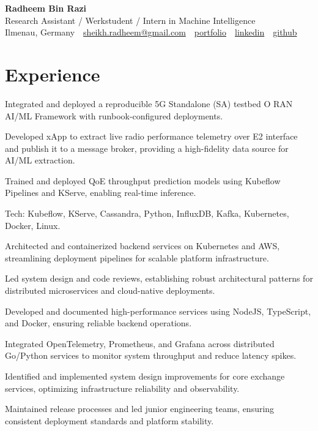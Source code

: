 \documentclass[10pt,a4paper]{resume}
\makeatletter
\newcommand{\Portfolio}{https://radheem.github.io/my-cv}
\newcommand{\PortfolioText}{portfolio}
\newcommand{\GitHub}{https://github.com/radheem}
\newcommand{\LinkedIn}{https://www.linkedin.com/in/radheem-razi}
\newcommand{\Email}{sheikh.radheem@gmail.com}
\makeatother
\begin{document}
\begin{center}
  {\huge\bfseries Radheem Bin Razi}\\[3pt]
  {\large Research Assistant / Werkstudent / Intern in Machine Intelligence}\\[6pt]
  \small
  Ilmenau, Germany \,\textbar\,
  \href{mailto:\Email}{\Email} \,\textbar\,
  \href{\Portfolio}{\PortfolioText} \,\textbar\,
  \href{\LinkedIn}{linkedin} \,\textbar\,
  \href{\GitHub}{github}
\end{center}
\vspace{2pt}

\section{Experience}

\bullets
  \item Integrated and deployed a reproducible 5G Standalone (SA) testbed O RAN AI/ML Framework with runbook-configured deployments.
  \item Developed xApp to extract live radio performance telemetry over E2 interface and publish it to a message broker, providing a high-fidelity data source for AI/ML extraction.
  \item Trained and deployed QoE throughput prediction models using Kubeflow Pipelines and KServe, enabling real-time inference.
  \item Tech: Kubeflow, KServe, Cassandra, Python, InfluxDB, Kafka, Kubernetes, Docker, Linux.
\bulletsend
\vspace{1.5pt}
\bullets
  \item Architected and containerized backend services on Kubernetes and AWS, streamlining deployment pipelines for scalable platform infrastructure.
  \item Led system design and code reviews, establishing robust architectural patterns for distributed microservices and cloud-native deployments.
  \item Developed and documented high-performance services using NodeJS, TypeScript, and Docker, ensuring reliable backend operations.
\bulletsend
\vspace{1.5pt}
\bullets
  \item Integrated OpenTelemetry, Prometheus, and Grafana across distributed Go/Python services to monitor system throughput and reduce latency spikes.
  \item Identified and implemented system design improvements for core exchange services, optimizing infrastructure reliability and observability.
  \item Maintained release processes and led junior engineering teams, ensuring consistent deployment standards and platform stability.
\bulletsend
\vspace{1.5pt}
\end{document}

